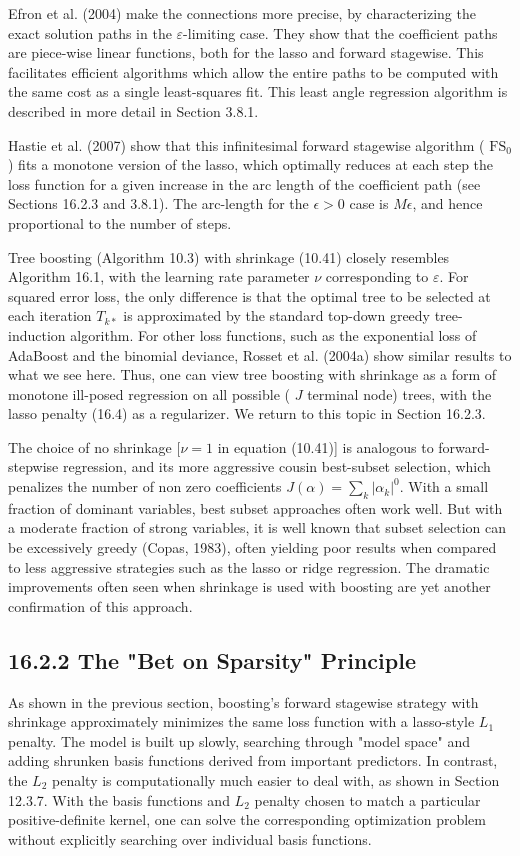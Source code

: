 \documentclass[10pt]{article}
\begin{document}
Efron et al. (2004) make the connections more precise, by characterizing the exact solution paths in the $\varepsilon$-limiting case. They show that the coefficient paths are piece-wise linear functions, both for the lasso and forward stagewise. This facilitates efficient algorithms which allow the entire paths to be computed with the same cost as a single least-squares fit. This least angle regression algorithm is described in more detail in Section 3.8.1.

Hastie et al. (2007) show that this infinitesimal forward stagewise algorithm ( $\mathrm{FS}_{0}$ ) fits a monotone version of the lasso, which optimally reduces at each step the loss function for a given increase in the arc length of the coefficient path (see Sections 16.2.3 and 3.8.1). The arc-length for the $\epsilon>0$ case is $M \epsilon$, and hence proportional to the number of steps.

Tree boosting (Algorithm 10.3) with shrinkage (10.41) closely resembles Algorithm 16.1, with the learning rate parameter $\nu$ corresponding to $\varepsilon$. For squared error loss, the only difference is that the optimal tree to be selected at each iteration $T_{k *}$ is approximated by the standard top-down greedy tree-induction algorithm. For other loss functions, such as the exponential loss of AdaBoost and the binomial deviance, Rosset et al. (2004a) show similar results to what we see here. Thus, one can view tree boosting with shrinkage as a form of monotone ill-posed regression on all possible ( $J$ terminal node) trees, with the lasso penalty (16.4) as a regularizer. We return to this topic in Section 16.2.3.

The choice of no shrinkage $[\nu=1$ in equation (10.41)] is analogous to forward-stepwise regression, and its more aggressive cousin best-subset selection, which penalizes the number of non zero coefficients $J(\alpha)=\sum_{k}\left|\alpha_{k}\right|^{0}$. With a small fraction of dominant variables, best subset approaches often work well. But with a moderate fraction of strong variables, it is well known that subset selection can be excessively greedy (Copas, 1983), often yielding poor results when compared to less aggressive strategies such as the lasso or ridge regression. The dramatic improvements often seen when shrinkage is used with boosting are yet another confirmation of this approach.

\subsection*{16.2.2 The "Bet on Sparsity" Principle}
As shown in the previous section, boosting's forward stagewise strategy with shrinkage approximately minimizes the same loss function with a lasso-style $L_{1}$ penalty. The model is built up slowly, searching through "model space" and adding shrunken basis functions derived from important predictors. In contrast, the $L_{2}$ penalty is computationally much easier to deal with, as shown in Section 12.3.7. With the basis functions and $L_{2}$ penalty chosen to match a particular positive-definite kernel, one can solve the corresponding optimization problem without explicitly searching over individual basis functions.
\end{document}
